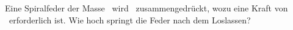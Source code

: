 Eine Spiralfeder der Masse \msfO\ wird \ssfO\ zusammengedrückt, wozu eine Kraft von \FsfO\ erforderlich ist. Wie hoch springt die Feder nach dem Loslassen?
